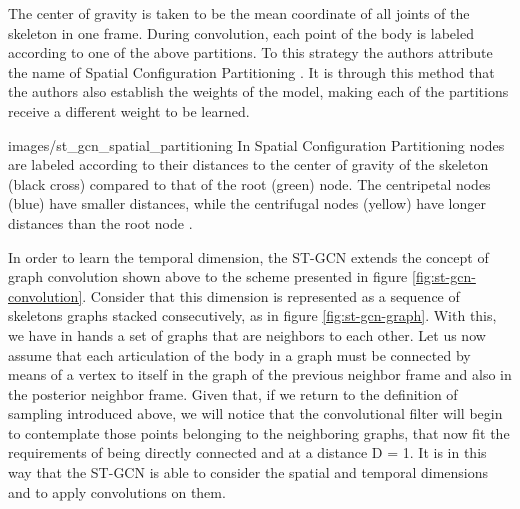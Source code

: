 The center of gravity is taken to be the mean coordinate of all joints of the skeleton in one frame. During convolution, each point of the body is labeled according to one of the above partitions. To this strategy the authors attribute the name of Spatial Configuration Partitioning \cite{st-gcn-2018}. It is through this method that the authors also establish the weights of the model, making each of the partitions receive a different weight to be learned.


    {images/st_gcn_spatial_partitioning}
    {In Spatial Configuration Partitioning nodes are labeled according to their distances to the center of gravity of the skeleton (black cross) compared to that of the root (green) node. The centripetal nodes (blue) have smaller distances, while the centrifugal nodes (yellow) have longer distances than the root node \cite[p. 5]{st-gcn-2018}.}
    
In order to learn the temporal dimension, the ST-GCN extends the concept of graph convolution shown above to the scheme presented in figure \ref{fig:st-gcn-convolution}. Consider that this dimension is represented as a sequence of skeletons graphs stacked consecutively, as in figure \ref{fig:st-gcn-graph}. With this, we have in hands a set of graphs that are neighbors to each other. Let us now assume that each articulation of the body in a graph must be connected by means of a vertex to itself in the graph of the previous neighbor frame and also in the posterior neighbor frame. Given that, if we return to the definition of sampling introduced above, we will notice that the convolutional filter will begin to contemplate those points belonging to the neighboring graphs, that now fit the requirements of being directly connected and at a distance D = 1. It is in this way that the ST-GCN is able to consider the spatial and temporal dimensions and to apply convolutions on them.

